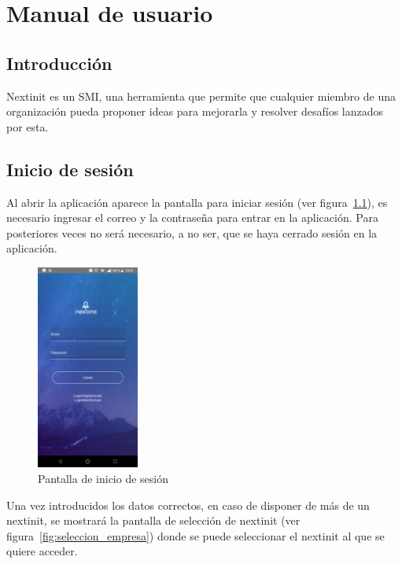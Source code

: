 \chapter{Manual de usuario}

\section{Introducción}

 Nextinit es un \acs{SMI}, una herramienta que permite que cualquier miembro 
 de una organización pueda proponer ideas para mejorarla y resolver desafíos 
 lanzados por esta.

\section{Inicio de sesión}

Al abrir la aplicación aparece la pantalla para iniciar sesión (ver figura~\ref{fig:login}), es 
necesario ingresar el correo y la contraseña para entrar en la aplicación. Para posteriores 
veces no será necesario, a no ser, que se haya cerrado sesión en la aplicación.

\begin{figure}[!h]
	\begin{center}
		\includegraphics[width=0.3\textwidth]{./img/anexo1/login.png}
		\caption{Pantalla de inicio de sesión}
		\label{fig:login}
	\end{center}
\end{figure}

Una vez introducidos los datos correctos, en caso de disponer de más de un nextinit,
se mostrará la pantalla de selección de nextinit (ver figura~\ref{fig:seleccion_empresa}) 
donde se puede seleccionar el nextinit al que se quiere acceder.

